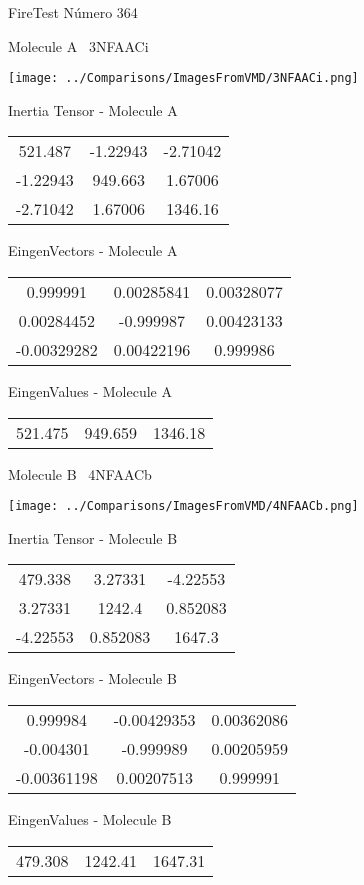 \vtab[-3cm]
\begin{center}
{\large FireTest \tab Número 364}
\end{center}
\begin{multicols}{2}
\begin{center}

Molecule A \
3NFAACi

\texttt{[image: ../Comparisons/ImagesFromVMD/3NFAACi.png]}

Inertia Tensor - Molecule A \\
\begin{tabular}{|c c c|}
521.487	 & 	-1.22943	 & 	-2.71042	 \\
-1.22943	 & 	949.663	 & 	1.67006	 \\
-2.71042	 & 	1.67006	 & 	1346.16
\end{tabular}

\vtab
 EingenVectors - Molecule A     \\
\begin{tabular}{|c c c|}
0.999991	 & 	0.00285841	 & 	0.00328077	 \\
0.00284452	 & 	-0.999987	 & 	0.00423133	 \\
-0.00329282	 & 	0.00422196	 & 	0.999986
\end{tabular}

\vtab
 EingenValues - Molecule A     \\
\begin{tabular}{|c c c|}
521.475	 & 	949.659	 & 	1346.18	 \\
\end{tabular}
\columnbreak

Molecule B \
4NFAACb

\texttt{[image: ../Comparisons/ImagesFromVMD/4NFAACb.png]}

Inertia Tensor - Molecule B \\
\begin{tabular}{|c c c|}
479.338	 & 	3.27331	 & 	-4.22553	 \\
3.27331	 & 	1242.4	 & 	0.852083	 \\
-4.22553	 & 	0.852083	 & 	1647.3
\end{tabular}

\vtab
 EingenVectors - Molecule B     \\
\begin{tabular}{|c c c|}
0.999984	 & 	-0.00429353	 & 	0.00362086	 \\
-0.004301	 & 	-0.999989	 & 	0.00205959	 \\
-0.00361198	 & 	0.00207513	 & 	0.999991
\end{tabular}

\vtab
 EingenValues - Molecule B     \\
\begin{tabular}{|c c c|}
479.308	 & 	1242.41	 & 	1647.31	 \\
\end{tabular}

\end{center}
\end{multicols}

